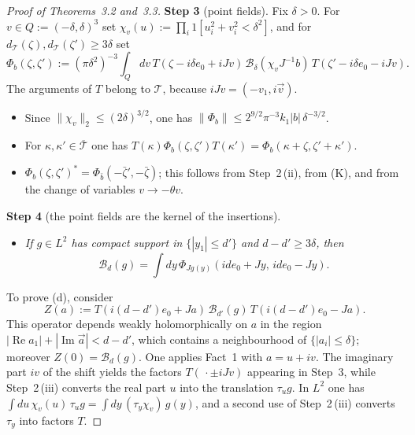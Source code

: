 \documentclass[11pt]{amsart}
\theoremstyle{definition}
\begin{document}
\begin{proof}[Proof of Theorems~3.2 and~3.3]
\textbf{Step 3} (point fields).
Fix $\delta>0$.
For $v\in Q:=(-\delta,\delta)^3$ set $\chi_v(u):=\prod_i1[u_i^2+v_i^2<\delta^2]$, and for $d_{\mathcal T}(\zeta),d_{\mathcal T}(\zeta')\ge3\delta$ set
\begin{equation*}
\Phi_b(\zeta,\zeta'):=(\pi\delta^2)^{-3}\int_Qdv\,T(\zeta-i\delta e_0+iJv)\,\mathcal B_\delta(\chi_vJ^{-1}b)\,T(\zeta'-i\delta e_0-iJv).
\end{equation*}
The arguments of $T$ belong to $\mathcal T$, because $iJv=(-v_1,i\vec v)$.
\begin{itemize}
\item[(a)] Since $\|\chi_v\|_2\le(2\delta)^{3/2}$, one has $\|\Phi_b\|\le2^{9/2}\pi^{-3}k_1|b|\,\delta^{-3/2}$.
\item[(b)] For $\kappa,\kappa'\in\overline{\mathcal T}$ one has $T(\kappa)\Phi_b(\zeta,\allowbreak \zeta')T(\kappa')=\allowbreak \Phi_b(\kappa+\zeta,\allowbreak \zeta'+\kappa')$.
\item[(c)] $\Phi_b(\zeta,\zeta')^*=\Phi_{\bar b}(-\bar\zeta',-\bar\zeta)$; this follows from Step~2\,(ii), from (K), and from the change of variables $v\to-\theta v$.
\end{itemize}

\textbf{Step 4} (the point fields are the kernel of the insertions).
\begin{itemize}
\item[(d)] \emph{If $g\in L^2$ has compact support in $\{|y_1|\le d'\}$ and $d-d'\ge3\delta$, then}
\begin{equation*}
\mathcal B_d(g)=\int dy\,\Phi_{Jg(y)}(ide_0+Jy,\,ide_0-Jy).
\end{equation*}
\end{itemize}
To prove (d), consider
\begin{equation*}
Z(a):=T(i(d-d')e_0+Ja)\,\mathcal B_{d'}(g)\,T(i(d-d')e_0-Ja).
\end{equation*}
This operator depends weakly holomorphically on $a$ in the region $|\operatorname{Re}a_1|+|\operatorname{Im}\vec a|<d-d'$, which contains a neighbourhood of $\{|a_i|\le\delta\}$; moreover $Z(0)=\mathcal B_d(g)$.
One applies Fact~1 with $a=u+iv$.
The imaginary part $iv$ of the shift yields the factors $T(\,\cdot\pm iJv)$ appearing in Step~3, while Step~2\,(iii) converts the real part $u$ into the translation $\tau_ug$.
In $L^2$ one has $\int du\,\chi_v(u)\,\tau_ug=\int dy\,(\tau_y\chi_v)\,g(y)$, and a second use of Step~2\,(iii) converts $\tau_y$ into factors $T$.


\end{proof}
\end{document}

